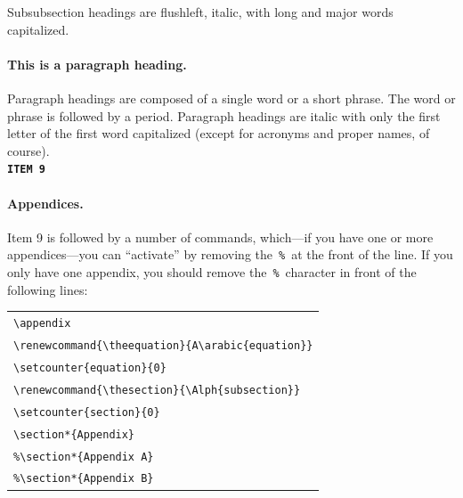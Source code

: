 \documentclass[titlepage,12pt]{article}
\begin{document}
Subsubsection headings are flushleft, italic, with long and major
words capitalized.

\paragraph{This is a paragraph heading.} Paragraph headings are composed of
a single word or a short phrase. The word or phrase is followed
by a period. Paragraph headings are italic with only the first letter of the
first word capitalized (except for acronyms and proper names,
of course).\\[1.5ex]

\noindent\texttt{\bf ITEM 9}\\[1.5ex]

\paragraph{Appendices.} Item 9 is followed by a number of
commands, which---if you have one or more appendices---you can
``activate'' by removing the~\verb=%=~at the front of the line.
If you only have one appendix, you should remove
the~\verb=%=~character in front of the following lines:

\begin{center}
{}
\begin{tabular}{l}
\verb=\appendix= \\
\verb=\renewcommand{\theequation}{A\arabic{equation}}=  \\
\verb=\setcounter{equation}{0}=  \\
\verb=\renewcommand{\thesection}{\Alph{subsection}}= \\
\verb=\setcounter{section}{0}= \\
\verb=\section*{Appendix}= \\
\verb=%\section*{Appendix A}= \\
\verb=%\section*{Appendix B}= \\
\end{tabular}
\end{center}
{}
\end{document}
